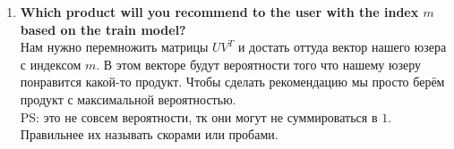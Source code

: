 \documentclass{article}
\begin{document}
{\begin{enumerate}
    \item \textbf{Which product will you recommend to the user with the index $m$ based on the train model?} \\
      Нам нужно перемножить матрицы $UV^T$ и достать оттуда вектор нашего юзера с индексом $m$.
      В этом векторе будут вероятности того что нашему юзеру понравится какой-то продукт.
      Чтобы сделать рекомендацию мы просто берём продукт с максимальной вероятностью. \\
      PS: это не совсем вероятности, тк они могут не суммироваться в $1$. Правильнее их называть скорами или пробами.
  \end{enumerate}
}

\end{document}
